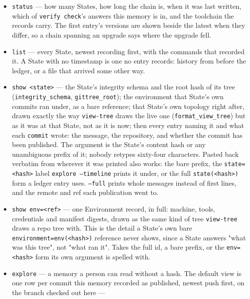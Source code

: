 \begin{itemize}
  \item \texttt{status} --- how many States, how long the chain is, when it
        was last written, which of \texttt{verify check}'s answers this
        memory is in, and the toolchain the records carry. The first
        entry's versions are shown beside the latest when they differ, so a
        chain spanning an upgrade says where the upgrade fell.
  \item \texttt{list} --- every State, newest recording first, with the
        commands that recorded it. A State with no timestamp is one no
        entry records: history from before the ledger, or a file that
        arrived some other way.
  \item \texttt{show <state>} --- the State's integrity schema and the
        root hash of its tree (\texttt{integrity\_schema},
        \texttt{gittree\_root}); the environment that State's own commits
        ran under, as a bare reference; that State's own topology right
        after, drawn exactly the way \texttt{view-tree} draws the live one
        (\texttt{format\_view\_tree}) but as it was at that State, not as it
        is now; then every entry naming it and what each \texttt{commit}
        wrote: the message, the repository, and whether the commit has been
        published. The argument is the State's content hash or any
        unambiguous prefix of it; nobody retypes sixty-four characters.
        Pasted back verbatim from wherever it was printed also works: the
        bare prefix, the \texttt{state=<hash>} label \texttt{explore
        --timeline} prints it under, or the full \texttt{state(<hash>)} form
        a ledger entry uses. \texttt{--full} prints whole messages instead
        of first lines, and the remote and ref each publication went to.
  \item \texttt{show env=<ref>} --- one Environment record, in full: machine,
        tools, credentials and manifest digests, drawn as the same kind of
        tree \texttt{view-tree} draws a repo tree with. This is the detail a
        State's own bare \texttt{environment=env(<hash>)} reference never
        shows, since a State answers "what was this tree", not "what ran
        it". Takes the full id, a bare prefix, or the \texttt{env=<hash>}
        form its own argument is spelled with.
  \item \texttt{explore} --- a memory a person can read without a hash.
        The default view is one row per commit this memory recorded as
        published, newest push first, on the branch checked out here ---

\end{itemize}
